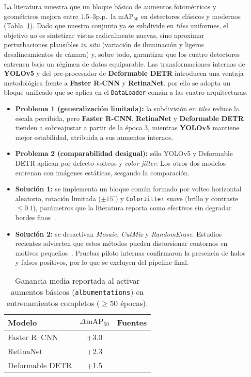 La literatura muestra que un bloque básico de aumentos fotométricos y geométricos mejora entre 1.5–3p.p.\ la \(\text{mAP}_{50}\) en detectores clásicos y modernos (Tabla~\ref{tab:aug_lit}).
Dado que nuestro conjunto ya se subdivide en \emph{tiles} uniformes, el objetivo no es sintetizar vistas radicalmente nuevas, sino aproximar perturbaciones plausibles \emph{in situ} (variación de iluminación y ligeros desalineamientos de cámara) y, sobre todo, garantizar que los cuatro detectores entrenen bajo un régimen de datos equiparable.  
Las transformaciones internas de \textbf{YOLOv5} y del pre‐procesador de \textbf{Deformable DETR} introducen una ventaja metodológica frente a \textbf{Faster R‐CNN} y \textbf{RetinaNet}.
por ello se adopta un bloque unificado que se aplica en el \texttt{DataLoader} común a las cuatro arquitecturas.

\begin{itemize}
   \item \textbf{Problema 1 (generalización limitada):} la subdivisión en \emph{tiles} reduce la escala percibida, pero \textbf{Faster R‐CNN}, \textbf{RetinaNet} y \textbf{Deformable DETR} tienden a sobreajustar a partir de la época 3, mientras \textbf{YOLOv5} mantiene mejor estabilidad, atribuida a sus aumentos internos.
   \item \textbf{Problema 2 (comparabilidad desigual):} sólo YOLOv5 y Deformable DETR aplican por defecto volteos y \emph{color jitter}.
   Los otros dos modelos entrenan con imágenes estáticas, sesgando la comparación.
   \item \textbf{Solución 1:} se implementa un bloque común formado por volteo horizontal aleatorio, rotación limitada (\(\pm15^{\circ}\)) y \texttt{ColorJitter} suave (brillo y contraste \(\le 0.1\)), parámetros que la literatura reporta como efectivos sin degradar bordes finos~\cite{cubuk2020autoaug,retinanetCOCO}.
   \item \textbf{Solución 2:} se desactivan \emph{Mosaic}, \emph{CutMix} y \emph{RandomErase}.
   Estudios recientes advierten que estos métodos pueden distorsionar contornos en motivos pequeños~\cite{rtdetr2024cvpr}.
   Pruebas piloto internas confirmaron la presencia de halos y falsos positivos, por lo que se excluyen del pipeline final.
\end{itemize}

\begin{table}[!h]
    \centering
    \caption{Ganancia media reportada al activar aumentos básicos (\texttt{albumentations}) en entrenamientos completos ($\ge 50$ épocas).}
    \label{tab:aug_lit}
    \begin{tabular}{|l|c|l|}
        \hline
        \textbf{Modelo} & \(\Delta\text{mAP}_{50}\) & \textbf{Fuentes} \\ \hline
        Faster R--CNN    & +3.0 &~\cite{mdpi2020vehicles,mathworksRCNN} \\ \hline
        RetinaNet        & +2.3 &~\cite{cubuk2020autoaug,retinanetCOCO} \\ \hline
        Deformable DETR  & +1.5 &~\cite{rtdetr2024cvpr,smallobjDETR} \\ \hline
    \end{tabular}
\end{table}


